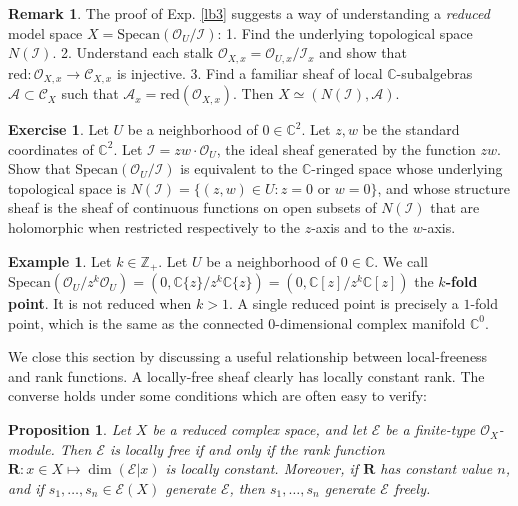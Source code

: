 \documentclass[12pt,b5paper,notitlepage]{report}
\theoremstyle{definition}
\newtheorem{eg}[df]{Example}
\newtheorem{exe}[df]{Exercise}
\newtheorem{rem}[df]{Remark}
\theoremstyle{plain}
\newtheorem{pp}[df]{Proposition}
\newcommand{\mc}{\mathcal}
\newcommand{\scr}{\mathscr}
\newcommand{\Cbb}{\mathbb C}
\newcommand{\Zbb}{\mathbb Z}
\newcommand{\Rbf}{\mathbf R}
\newcommand{\Specan}{\mathrm{Specan}}
\newcommand{\red}{\mathrm{red}}
\numberwithin{equation}{section}
\begin{document}
\begin{rem}
The proof of Exp. \ref{lb3} suggests a way of understanding a \textit{reduced} model space $X=\Specan(\scr O_U/\mc I)$: 1. Find the underlying topological space $N(\mc I)$. 2. Understand each stalk $\scr O_{X,x}=\scr O_{U,x}/\mc I_x$ and show that $\red:\scr O_{X,x}\rightarrow\scr C_{X,x}$ is injective. 3. Find a familiar sheaf of local $\Cbb$-subalgebras $\scr A\subset\scr C_X$ such that $\scr A_x=\red(\scr O_{X,x})$. Then $X\simeq (N(\mc I),\scr A)$.
\end{rem}


\begin{exe}
Let $U$ be a neighborhood of $0\in\Cbb^2$. Let $z,w$ be the standard coordinates of $\Cbb^2$. Let $\mc I=zw\cdot \scr O_U$, the ideal sheaf generated by the function $zw$. Show that $\Specan(\scr O_U/\mc I)$ is equivalent to the $\Cbb$-ringed space whose underlying topological space  is $N(\mc I)=\{(z,w)\in U:z=0\text{ or }w=0\}$, and whose structure sheaf is the sheaf of continuous functions on open subsets of $N(\mc I)$ that are holomorphic when restricted respectively to the $z$-axis and to the $w$-axis.
\end{exe}


\begin{eg}
Let $k\in\Zbb_+$. Let $U$ be a neighborhood of $0\in\Cbb$. We call $\Specan(\scr O_U/z^k\scr O_U)=(0,\Cbb\{z\}/z^k\Cbb\{z\})=(0,\Cbb[z]/z^k\Cbb[z])$ the \textbf{$k$-fold point}. It is not reduced when $k>1$. A single reduced point is precisely a $1$-fold point, which is the same as the connected $0$-dimensional complex manifold $\Cbb^0$.  
\end{eg}




We close this section by discussing a useful relationship between local-freeness and rank functions. A locally-free sheaf clearly has locally constant rank. The converse holds under some conditions which are often easy to verify:



\begin{pp}\label{lb65}
Let $X$ be a {\color{red}reduced} complex space, and let $\scr E$ be a finite-type $\scr O_X$-module. Then $\scr E$ is locally free if and only if the rank function $\Rbf:x\in X\mapsto \dim(\scr E|x)$ is locally constant. Moreover, if $\Rbf$ has constant value $n$, and if $s_1,\dots,s_n\in\scr E(X)$ generate $\scr E$, then $s_1,\dots,s_n$ generate $\scr E$ freely.
\end{pp}
\end{document}
